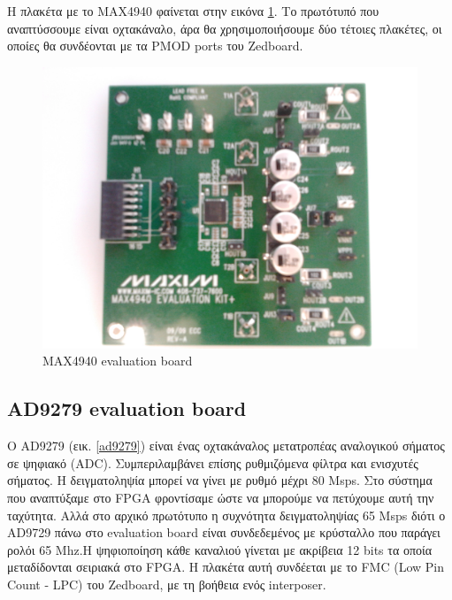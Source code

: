 \documentclass[12pt,a4paper]{book}
\begin{document}
Η πλακέτα με το MAX4940 φαίνεται στην εικόνα \ref{max4940}. Το πρωτότυπό που αναπτύσσουμε είναι οχτακάναλο, άρα θα χρησιμοποιήσουμε δύο τέτοιες πλακέτες, οι οποίες θα συνδέονται με τα PMOD ports του Zedboard. 
\begin{figure}
	\centering
	\includegraphics[width=\textwidth]{max4940}
	\caption{MAX4940 evaluation board}
	\label{max4940}
\end{figure}

\subsection{AD9279 evaluation board}
Ο AD9279 (εικ. \ref{ad9279}) είναι ένας οχτακάναλος μετατροπέας αναλογικού σήματος σε ψηφιακό (ADC). Συμπεριλαμβάνει επίσης ρυθμιζόμενα φίλτρα και ενισχυτές σήματος. Η δειγματοληψία μπορεί να γίνει με ρυθμό μέχρι 80 Msps. Στο σύστημα που αναπτύξαμε στο FPGA φροντίσαμε ώστε να μπορούμε να πετύχουμε αυτή την ταχύτητα. Αλλά στο αρχικό πρωτότυπο η συχνότητα δειγματοληψίας 65 Msps διότι ο AD9729 πάνω στο evaluation board είναι συνδεδεμένος με κρύσταλλο που παράγει ρολόι 65 Mhz.Η ψηφιοποίηση κάθε καναλιού γίνεται με ακρίβεια 12 bits τα οποία μεταδίδονται σειριακά στο FPGA. Η πλακέτα αυτή συνδέεται με το FMC (Low Pin Count - LPC) του Zedboard, με τη βοήθεια ενός interposer.
\end{document}
